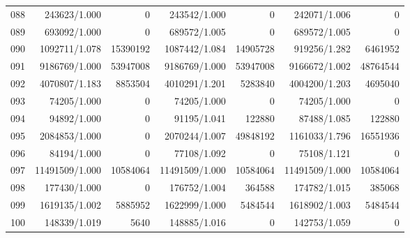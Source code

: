 \begin{longtable}{crrrrrr}
088 & 243623/1.000 & 0 & 243542/1.000 & 0 & 242071/1.006 & 0 \\
089 & 693092/1.000 & 0 & 689572/1.005 & 0 & 689572/1.005 & 0 \\
090 & 1092711/1.078 & 15390192 & 1087442/1.084 & 14905728 & 919256/1.282 & 6461952 \\
091 & 9186769/1.000 & 53947008 & 9186769/1.000 & 53947008 & 9166672/1.002 & 48764544 \\
092 & 4070807/1.183 & 8853504 & 4010291/1.201 & 5283840 & 4004200/1.203 & 4695040 \\
093 & 74205/1.000 & 0 & 74205/1.000 & 0 & 74205/1.000 & 0 \\
094 & 94892/1.000 & 0 & 91195/1.041 & 122880 & 87488/1.085 & 122880 \\
095 & 2084853/1.000 & 0 & 2070244/1.007 & 49848192 & 1161033/1.796 & 16551936 \\
096 & 84194/1.000 & 0 & 77108/1.092 & 0 & 75108/1.121 & 0 \\
097 & 11491509/1.000 & 10584064 & 11491509/1.000 & 10584064 & 11491509/1.000 & 10584064 \\
098 & 177430/1.000 & 0 & 176752/1.004 & 364588 & 174782/1.015 & 385068 \\
099 & 1619135/1.002 & 5885952 & 1622999/1.000 & 5484544 & 1618902/1.003 & 5484544 \\
100 & 148339/1.019 & 5640 & 148885/1.016 & 0 & 142753/1.059 & 0 \\
\end{longtable}


